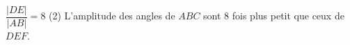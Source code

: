 \begin{enumerate}
\begin{QCM}
                  \choice $\dfrac{|DE|}{|AB|}=8$
                  \choice*(2) L'amplitude des angles de $ABC$ sont 8 fois plus petit que ceux de $DEF$.
              \end{QCM}
    \end{enumerate}
